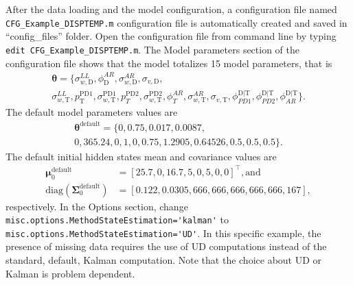 After the data loading and the model configuration, a configuration file named \lstinline[basicstyle = \mlttfamily \small, backgroundcolor = \color{light-gray}]!CFG_Example_DISPTEMP.m! configuration file is automatically created and saved in ``config\_files'' folder.
Open the configuration file from \MATLAB{} command line by typing  \colorbox{light-gray}{\lstinline[basicstyle = \mlttfamily \small, backgroundcolor = \color{light-gray}]!edit CFG_Example_DISPTEMP.m!}.
The Model parameters section of the configuration file shows that the model totalizes 15 model parameters, that is 
\begin{gather*}
\bm\theta=\{\sigma_{w, \text{D}}^{LL},  \phi^{AR}_{\text{D}}, \sigma_{w,\text{D}}^{AR} ,\sigma_{v,\text{D}},  \\
 \sigma_{w, \text{T}}^{LL}, p^{\text{PD1}}_{\text{T}}, \sigma_{w,\text{T}}^{\text{PD1}} , p^{\text{PD2}}_{T}, \sigma_{w, \text{T}}^{\text{PD2}}, \phi^{AR}_{T}, \sigma_{w, \text{T}}^{AR}, \sigma_{v,\text{T}}, \phi^{\text{D}|\text{T}}_{PD1}, \phi^{\text{D}|\text{T}}_{PD2},  \phi^{\text{D}|\text{T}}_{AR}\}.
\end{gather*}
The default model parameters values are 
\begin{gather*}
\bm\theta^{\text{default}}=\{0, 0.75, 0.017, 0.0087, \\
0, 365.24, 0, 1, 0, 0.75, 1.2905, 0.64526, 0.5, 0.5, 0.5 \}.
\end{gather*}
The default initial hidden states mean  and covariance values are 
\begin{align*}
 \bm \mu^{\text{default}}_{0} & = [	25.7  ,	0  ,   	16.7  	, 5     ,	0   ,  	5   ,  	0    , 	0        ]^{\intercal}, \text{and} \\
 \text{diag}(\bm\Sigma^{\text{default}}_{0})  & = [	0.122, 	0.0305,	666,   	666,   	666,   	666,   	666 ,  	167     ],
\end{align*}
respectively.
In the Options section, change \lstinline[basicstyle = \mlttfamily \small, backgroundcolor = \color{light-gray}]!misc.options.MethodStateEstimation='kalman'! to \lstinline[basicstyle = \mlttfamily \small, backgroundcolor = \color{light-gray}]!misc.options.MethodStateEstimation='UD'!. 
In this specific example, the presence of missing data requires the use of UD computations instead of the standard, default, Kalman computation.
Note that the choice about UD or Kalman is problem dependent. 

